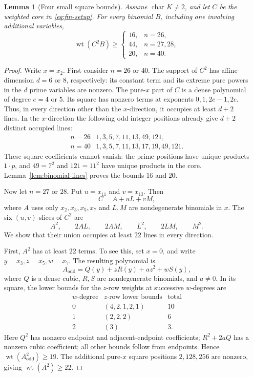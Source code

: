 \documentclass[11pt]{article}
\DeclareMathOperator{\wt}{wt}\DeclareMathOperator{\ord}{ord}
\numberwithin{equation}{section}
\newtheorem{lemma}[theorem]{Lemma}
\theoremstyle{definition}\newtheorem{definition}[theorem]{Definition}
\theoremstyle{remark}\newtheorem{remark}[theorem]{Remark}
\begin{document}
\begin{lemma}[Four small square bounds]\label{lem:finite-binomial-squares}
Assume $\operatorname{char}K\ne2$, and let $C$ be the weighted core
in \eqref{eq:fin-setup}. For every binomial $B$, including one involving
additional variables,
\[
 \wt(C^2B)\ge
 \begin{cases}
 16,&n=26,\\
 44,&n=27,28,\\
 20,&n=40.
 \end{cases}
\]
\end{lemma}
\begin{proof}
Write $x=x_2$. First consider $n=26$ or $40$. The support of $C^2$
has affine dimension $d=6$ or $8$, respectively: its constant term and
its extreme pure powers in the $d$ prime variables are nonzero.
The pure-$x$ part of $C$ is a dense polynomial of degree $e=4$ or $5$.
Its square has nonzero terms at exponents $0,1,2e-1,2e$. Thus, in
every direction other than the $x$-direction, it occupies at least
$d+2$ lines. In the $x$-direction the following odd integer positions
already give $d+2$ distinct occupied lines:
\[
 \begin{array}{c|l}
 n=26&1,3,5,7,11,13,49,121,\\
 n=40&1,3,5,7,11,13,17,19,49,121.
 \end{array}
\]
These square coefficients cannot vanish: the prime positions have
unique products $1\cdot p$, and $49=7^2$ and $121=11^2$ have unique
products in the core. Lemma~\ref{lem:binomial-lines} proves the bounds
$16$ and $20$.

Now let $n=27$ or $28$. Put $u=x_{11}$ and $v=x_{13}$. Then
\[
 C=A+uL+vM,
\]
where $A$ uses only $x_2,x_3,x_5,x_7$ and $L,M$ are nondegenerate
binomials in $x$. The six $(u,v)$-slices of $C^2$ are
\[
 A^2,\qquad 2AL,\qquad 2AM,\qquad L^2,\qquad 2LM,\qquad M^2.
\]
We show that their union occupies at least $22$ lines in every direction.

First, $A^2$ has at least $22$ terms. To see this,
set $x=0$, and write $y=x_3,z=x_5,w=x_7$. The resulting polynomial is
\[
 A_{\mathrm{odd}}=Q(y)+zR(y)+a z^2+wS(y),
\]
where $Q$ is a dense cubic, $R,S$ are nondegenerate binomials, and
$a\ne0$. In its square, the lower bounds for the $z$-row weights at
successive $w$-degrees are
\[
 \begin{array}{c|c|c}
 \text{$w$-degree}&\text{$z$-row lower bounds}&\text{total}\\\hline
 0&(4,2,1,2,1)&10\\
 1&(2,2,2)&6\\
 2&(3)&3.
 \end{array}
\]
Here $Q^2$ has nonzero endpoint and adjacent-endpoint coefficients;
$R^2+2aQ$ has a nonzero cubic coefficient; all other bounds follow
from endpoints. Hence $\wt(A_{\mathrm{odd}}^2)\ge19$. The additional
pure-$x$ square positions $2,128,256$ are nonzero, giving
$\wt(A^2)\ge22$.


\end{proof}
\end{document}
